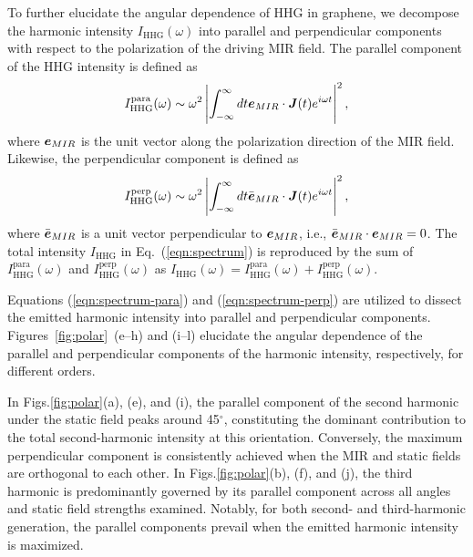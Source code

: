 To further elucidate the angular dependence of HHG in graphene, we decompose the harmonic intensity $I_{\mathrm{HHG}}(\omega)$ into parallel and perpendicular components with respect to the polarization of the driving MIR field. The parallel component of the HHG intensity is defined as 
\begin{align}
I^{\textrm{para}}_{\mathrm{HHG}}(\omega)\sim \omega^2 \left | \int^{\infty}_{-\infty} dt \boldsymbol e_{MIR} \cdot \boldsymbol J(t) e^{i\omega t} \right |^2,
\label{eqn:spectrum-para}
\end{align}
where $\boldsymbol e_{MIR}$ is the unit vector along the polarization direction of the MIR field. Likewise, the perpendicular component is defined as
\begin{align}
I^{\textrm{perp}}_{\mathrm{HHG}}(\omega)\sim \omega^2 \left | \int^{\infty}_{-\infty} dt \bar{\boldsymbol e}_{MIR} \cdot \boldsymbol J(t) e^{i\omega t} \right |^2,
\label{eqn:spectrum-perp}
\end{align}
where $\bar{\boldsymbol e}_{MIR}$ is a unit vector perpendicular to $\boldsymbol e_{MIR}$, i.e., $\bar{\boldsymbol e}_{MIR} \cdot\boldsymbol e_{MIR}=0$. The total intensity $I_{\textrm{HHG}}$ in Eq.~(\ref{eqn:spectrum}) is reproduced by the sum of $I^{\textrm{para}}_{\mathrm{HHG}}(\omega)$ and $I^{\textrm{perp}}_{\mathrm{HHG}}(\omega)$ as $I_{\mathrm{HHG}}(\omega)=I^{\textrm{para}}_{\mathrm{HHG}}(\omega)+I^{\textrm{perp}}_{\mathrm{HHG}}(\omega)$.

Equations (\ref{eqn:spectrum-para}) and (\ref{eqn:spectrum-perp}) are utilized to dissect the emitted harmonic intensity into parallel and perpendicular components. Figures~\ref{fig:polar}~(e--h) and (i--l) elucidate the angular dependence of the parallel and perpendicular components of the harmonic intensity, respectively, for different orders.

In Figs.\ref{fig:polar}(a), (e), and (i), the parallel component of the second harmonic under the static field peaks around 45$^{\circ}$, constituting the dominant contribution to the total second-harmonic intensity at this orientation. Conversely, the maximum perpendicular component is consistently achieved when the MIR and static fields are orthogonal to each other. In Figs.\ref{fig:polar}(b), (f), and (j), the third harmonic is predominantly governed by its parallel component across all angles and static field strengths examined. Notably, for both second- and third-harmonic generation, the parallel components prevail when the emitted harmonic intensity is maximized.

